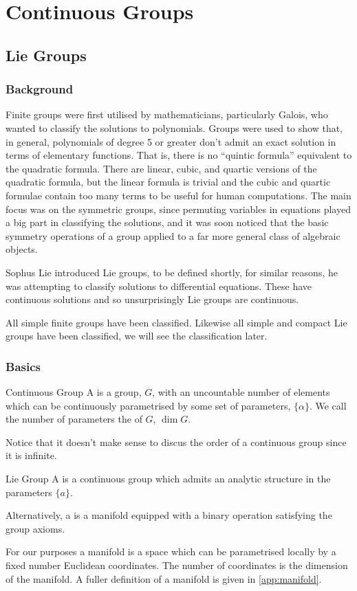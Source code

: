 \part{Continuous Groups}
\chapter{Lie Groups}
\section{Background}
Finite groups were first utilised by mathematicians, particularly Galois, who wanted to classify the solutions to polynomials.
Groups were used to show that, in general, polynomials of degree 5 or greater don't admit an exact solution in terms of elementary functions.
That is, there is no \enquote{quintic formula} equivalent to the quadratic formula.
There are linear, cubic, and quartic versions of the quadratic formula, but the linear formula is trivial and the cubic and quartic formulae contain too many terms to be useful for human computations.
The main focus was on the symmetric groups, since permuting variables in equations played a big part in classifying the solutions, and it was soon noticed that the basic symmetry operations of a group applied to a far more general class of algebraic objects.

Sophus Lie introduced Lie groups, to be defined shortly, for similar reasons, he was attempting to classify solutions to differential equations.
These have continuous solutions and so unsurprisingly Lie groups are continuous.

All simple finite groups have been classified.
Likewise all simple and compact Lie groups have been classified, we will see the classification later.

\section{Basics}
\begin{dfn}{Continuous Group}{}
    A  is a group, \(G\), with an uncountable number of elements which can be continuously parametrised by some set of parameters, \(\{\alpha\}\).
    We call the number of parameters the  of \(G\), \(\dim G\).
\end{dfn}
Notice that it doesn't make sense to discus the order of a continuous group since it is infinite.

\begin{dfn}{Lie Group}{}
    A  is a continuous group which admits an analytic structure in the parameters \(\{a\}\).
    
    Alternatively, a  is a manifold equipped with a binary operation satisfying the group axioms.
\end{dfn}
For our purposes a manifold is a space which can be parametrised locally by a fixed number Euclidean coordinates.
The number of coordinates is the dimension of the manifold.
A fuller definition of a manifold is given in \cref{app:manifold}.

